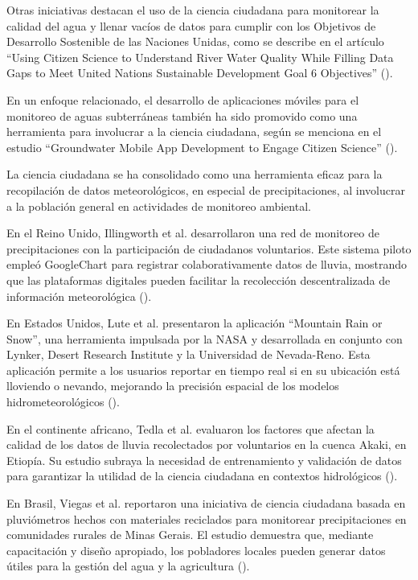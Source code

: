 Otras iniciativas destacan el uso de la ciencia ciudadana para monitorear la calidad del agua y llenar vacíos de datos para cumplir con los Objetivos de Desarrollo Sostenible de las Naciones Unidas, como se describe en el artículo ``Using Citizen Science to Understand River Water Quality While Filling Data Gaps to Meet United Nations Sustainable Development Goal 6 Objectives'' (\cite{mcginn2021using}).

En un enfoque relacionado, el desarrollo de aplicaciones móviles para el monitoreo de aguas subterráneas también ha sido promovido como una herramienta para involucrar a la ciencia ciudadana, según se menciona en el estudio ``Groundwater Mobile App Development to Engage Citizen Science'' (\cite{dennis2019groundwater}).
 

La ciencia ciudadana se ha consolidado como una herramienta eficaz para la recopilación de datos meteorológicos, en especial de precipitaciones, al involucrar a la población general en actividades de monitoreo ambiental.

En el Reino Unido, Illingworth et al. desarrollaron una red de monitoreo de precipitaciones con la participación de ciudadanos voluntarios. Este sistema piloto empleó GoogleChart para registrar colaborativamente datos de lluvia, mostrando que las plataformas digitales pueden facilitar la recolección descentralizada de información meteorológica (\cite{illingworth2021ukprecipitation}).

En Estados Unidos, Lute et al. presentaron la aplicación ``Mountain Rain or Snow'', una herramienta impulsada por la NASA y desarrollada en conjunto con Lynker, Desert Research Institute y la Universidad de Nevada-Reno. Esta aplicación permite a los usuarios reportar en tiempo real si en su ubicación está lloviendo o nevando, mejorando la precisión espacial de los modelos hidrometeorológicos  (\cite{lute2021enhancing}).

En el continente africano, Tedla et al. evaluaron los factores que afectan la calidad de los datos de lluvia recolectados por voluntarios en la cuenca Akaki, en Etiopía. Su estudio subraya la necesidad de entrenamiento y validación de datos para garantizar la utilidad de la ciencia ciudadana en contextos hidrológicos  (\cite{tedla2022evaluation}).

En Brasil, Viegas et al. reportaron una iniciativa de ciencia ciudadana basada en pluviómetros hechos con materiales reciclados para monitorear precipitaciones en comunidades rurales de Minas Gerais. El estudio demuestra que, mediante capacitación y diseño apropiado, los pobladores locales pueden generar datos útiles para la gestión del agua y la agricultura  (\cite{viegas2023citizen}).

